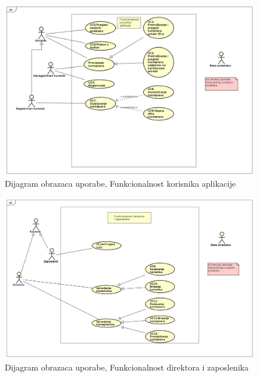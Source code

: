             \begin{figure}
                    \centering
                    \includegraphics[width=1.0\linewidth]{"slike/Funkcionalnost_korisnika_aplikacije"}
                    \caption{Dijagram obrazaca uporabe, Funkcionalnost korisnika aplikacije}
                    \label{fig:Funkcionalnost korisnika aplikacije}
            \end{figure}
            
            \clearpage
            
            \eject
            
            \begin{figure}
                    \centering
                    \includegraphics[width=1.0\linewidth]{"slike/Funkcionalnost_direktora_i_zaposlenika"}
                    \caption{Dijagram obrazaca uporabe, Funkcionalnost direktora i zaposlenika}
                    \label{fig:Funkcionalnost direktora i zaposlenika}
            \end{figure}
            

